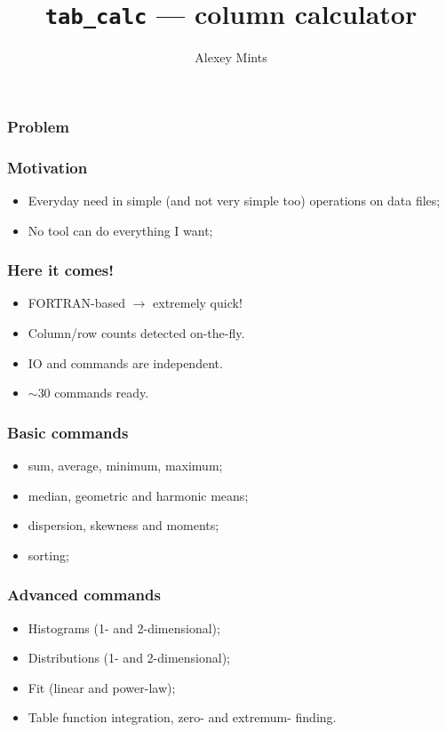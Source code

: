 \documentclass[14pt]{beamer}
\author{Alexey Mints}
\title{\texttt{tab\_calc} --- column calculator}
\begin{document}
\maketitle

\begin{frame}
 \frametitle{Problem}
 \begin{tiny} \end{tiny}
\end{frame}

\begin{frame}
 \frametitle{Motivation}
\begin{itemize}
 \item Everyday need in simple (and not very simple too) operations on data files;
 \item No tool can do everything I want;
\end{itemize}
\end{frame}

\begin{frame}
 \frametitle{Here it comes!}
\begin{itemize}
 \item FORTRAN-based $\xrightarrow{}$ extremely quick!
 \item Column/row counts detected on-the-fly.
 \item IO and commands are independent.
 \item $\sim30$ commands ready.
\end{itemize}

\end{frame}

\begin{frame}
 \frametitle{Basic commands}
\begin{itemize}
 \item sum, average, minimum, maximum;
 \item median, geometric and harmonic means;
 \item dispersion, skewness and moments;
 \item sorting;
\end{itemize}
\end{frame}

\begin{frame}
 \frametitle{Advanced commands}
\begin{itemize}
 \item Histograms (1- and 2-dimensional);
 \item Distributions (1- and 2-dimensional);
 \item Fit (linear and power-law);
 \item Table function integration, zero- and extremum- finding.
\end{itemize}
\end{frame}
\end{document}
